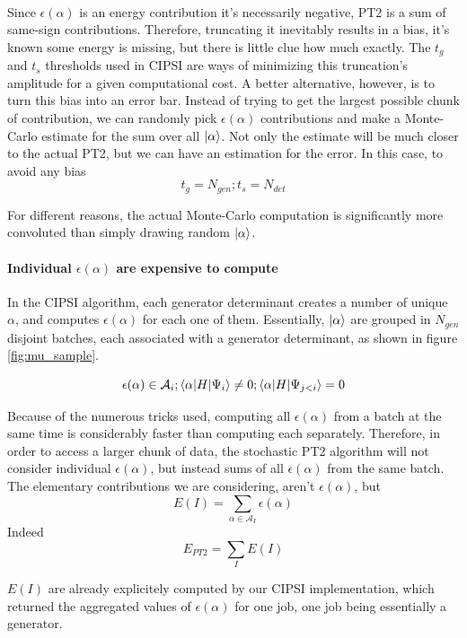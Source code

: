 \paragraph{}  Since $\epsilon	(\alpha)$ is an energy contribution it's necessarily negative, PT2 is a sum of same-sign contributions. Therefore, truncating it inevitably results in a bias, it's known some energy is missing, but there is little clue how much exactly. The $t_g$ and $t_s$ thresholds used in CIPSI are ways of minimizing this truncation's amplitude for a given computational cost.
A better alternative, however, is to turn this bias into an error bar. Instead of trying to get the largest possible chunk of contribution, we can randomly pick $\epsilon(\alpha)$ contributions and make a Monte-Carlo estimate for the sum over all $| \alpha \rangle$. Not only the estimate will be much closer to the actual PT2, but we can have an estimation for the error. In this case, to avoid any bias
$$t_g = N_{gen} ; t_s = N_{det}$$

For different reasons, the actual Monte-Carlo computation is significantly more convoluted than simply drawing random $| \alpha \rangle$.

\paragraph{Individual $\epsilon(\alpha)$ are expensive to compute}
In the CIPSI algorithm, each generator determinant creates a number of unique $\alpha$, and computes $\epsilon(\alpha)$ for each one of them.
Essentially, $| \alpha \rangle$ are grouped in $N_{gen}$ disjoint batches, each associated with a generator determinant, as shown in figure \ref{fig:mu_sample}.

	$$\epsilon(\alpha) \in \mathcal{A}_i ; \langle \alpha | H | \Psi_i \rangle \neq 0 ; \langle \alpha | H | \Psi_{j<i} \rangle =0 $$

Because of the numerous tricks used, computing all $\epsilon(\alpha)$ from a batch at the same time is considerably faster than computing each separately. Therefore, in order to access a larger chunk of data, the stochastic PT2 algorithm will not consider individual $\epsilon(\alpha)$, but instead sums of all $\epsilon(\alpha)$ from the same batch.
The elementary contributions we are considering, aren't $\epsilon(\alpha)$, but
	$$E(I) = \sum_{\alpha \in \mathcal{A}_I} \epsilon(\alpha)$$
Indeed
    $$E_{PT2} = \sum_{I} E(I)$$
    
$E(I)$ are already explicitely computed by our CIPSI implementation, which returned the aggregated values of $\epsilon(\alpha)$ for one job, one job being essentially a generator.

